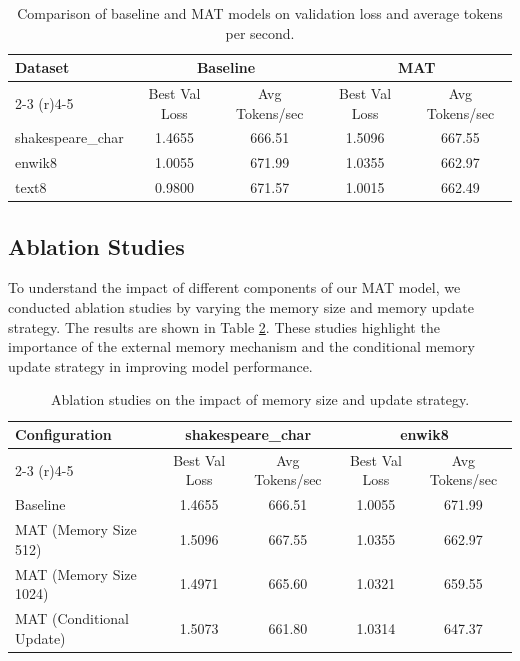 \documentclass{article} %
\begin{document}
\begin{table}[h]
    \centering
    \begin{tabular}{lcccc}
        \toprule
        \multirow{2}{*}{Dataset} & \multicolumn{2}{c}{Baseline} & \multicolumn{2}{c}{MAT} \\
        \cmidrule(r){2-3} \cmidrule(r){4-5}
        & Best Val Loss & Avg Tokens/sec & Best Val Loss & Avg Tokens/sec \\
        \midrule
        shakespeare\_char & 1.4655 & 666.51 & 1.5096 & 667.55 \\
        enwik8 & 1.0055 & 671.99 & 1.0355 & 662.97 \\
        text8 & 0.9800 & 671.57 & 1.0015 & 662.49 \\
        \bottomrule
    \end{tabular}
    \caption{Comparison of baseline and MAT models on validation loss and average tokens per second.}
    \label{tab:baseline_comparison}
\end{table}

\subsection{Ablation Studies}
To understand the impact of different components of our MAT model, we conducted ablation studies by varying the memory size and memory update strategy. The results are shown in Table \ref{tab:ablation_studies}. These studies highlight the importance of the external memory mechanism and the conditional memory update strategy in improving model performance.

\begin{table}[h]
    \centering
    \begin{tabular}{lcccc}
        \toprule
        \multirow{2}{*}{Configuration} & \multicolumn{2}{c}{shakespeare\_char} & \multicolumn{2}{c}{enwik8} \\
        \cmidrule(r){2-3} \cmidrule(r){4-5}
        & Best Val Loss & Avg Tokens/sec & Best Val Loss & Avg Tokens/sec \\
        \midrule
        Baseline & 1.4655 & 666.51 & 1.0055 & 671.99 \\
        MAT (Memory Size 512) & 1.5096 & 667.55 & 1.0355 & 662.97 \\
        MAT (Memory Size 1024) & 1.4971 & 665.60 & 1.0321 & 659.55 \\
        MAT (Conditional Update) & 1.5073 & 661.80 & 1.0314 & 647.37 \\
        \bottomrule
    \end{tabular}
    \caption{Ablation studies on the impact of memory size and update strategy.}
    \label{tab:ablation_studies}
\end{table}
\end{document}
